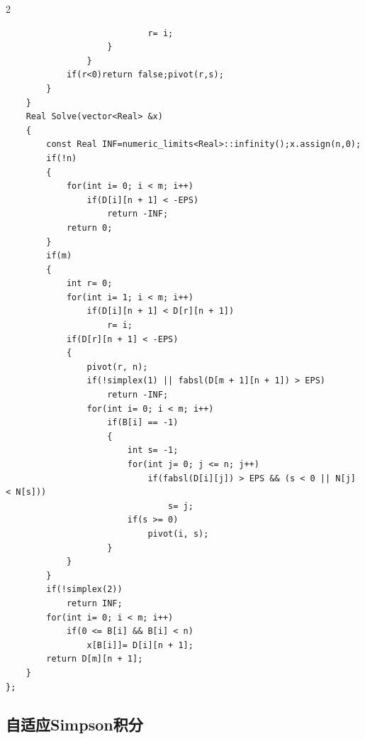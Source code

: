 \documentclass[UTF8,fontset=fandol,a4paper,twoside]{ctexart}
\begin{document}
\begin{multicols}{2}
\begin{lstlisting}
                            r= i;
                    }
                }
            if(r<0)return false;pivot(r,s);
        }
    }
    Real Solve(vector<Real> &x)
    {
        const Real INF=numeric_limits<Real>::infinity();x.assign(n,0);
        if(!n)
        {
            for(int i= 0; i < m; i++)
                if(D[i][n + 1] < -EPS)
                    return -INF;
            return 0;
        }
        if(m)
        {
            int r= 0;
            for(int i= 1; i < m; i++)
                if(D[i][n + 1] < D[r][n + 1])
                    r= i;
            if(D[r][n + 1] < -EPS)
            {
                pivot(r, n);
                if(!simplex(1) || fabsl(D[m + 1][n + 1]) > EPS)
                    return -INF;
                for(int i= 0; i < m; i++)
                    if(B[i] == -1)
                    {
                        int s= -1;
                        for(int j= 0; j <= n; j++)
                            if(fabsl(D[i][j]) > EPS && (s < 0 || N[j] < N[s]))
                                s= j;
                        if(s >= 0)
                            pivot(i, s);
                    }
            }
        }
        if(!simplex(2))
            return INF;
        for(int i= 0; i < m; i++)
            if(0 <= B[i] && B[i] < n)
                x[B[i]]= D[i][n + 1];
        return D[m][n + 1];
    }
};
\end{lstlisting}
\subsection{自适应Simpson积分}


\end{multicols}
\end{document}
